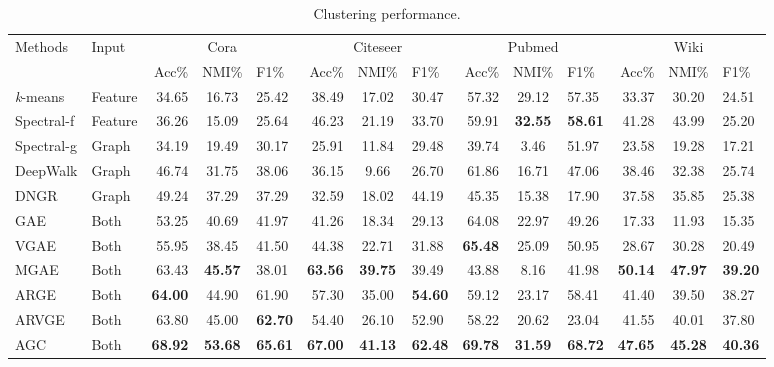 \documentclass{article}
\begin{document}
\begin{table*}[t]\footnotesize
 \centering
  \begin{tabular}{l l rcl| rcl| rcl| rcl}
   \toprule
   Methods & Input & \multicolumn{3}{c}{{Cora}} & \multicolumn{3}{c}{{Citeseer}} & \multicolumn{3}{c}{{Pubmed}} & \multicolumn{3}{c}{{Wiki}}\\
   \cmidrule(lr){3-5} \cmidrule(lr){6-8} \cmidrule(lr){9-11} \cmidrule(lr){12-14}
   & & {Acc\%} & {NMI\%} & {F1\%}  & {Acc\%} & {NMI\%} & {F1\%}  & {Acc\%} & {NMI\%} & {F1\%} & {Acc\%} & {NMI\%} & {F1\%}\\
   \midrule
   {\emph{k}-means}  & Feature & 34.65 & 16.73 & 25.42 & 38.49 & 17.02 & 30.47  & 57.32 & 29.12 & 57.35 & 33.37 & 30.20  & 24.51  \\
   Spectral-f  & Feature & 36.26 & 15.09 & 25.64 & 46.23 & 21.19 & 33.70  & 59.91 & \textbf{32.55} & \textbf{58.61} & 41.28 & 43.99 & 25.20  \\
   \midrule
   Spectral-g & Graph &  34.19 & 19.49 & 30.17 &  25.91 & 11.84 & 29.48 &  39.74 & 3.46 & 51.97 & 23.58 & 19.28 & 17.21  \\
   DeepWalk & Graph & 46.74 & 31.75 & 38.06  & 36.15 & 9.66 & 26.70  & 61.86 & 16.71 & 47.06 &  38.46 & 32.38 & 25.74  \\
   DNGR & Graph   & 49.24 & 37.29 & 37.29  & 32.59 & 18.02 & 44.19 & 45.35 & 15.38 & 17.90 & 37.58 & 35.85 & 25.38  \\
   \midrule
   GAE & Both & 53.25 & 40.69 & 41.97 & 41.26 & 18.34 & 29.13  & 64.08 & 22.97 & 49.26 &  17.33 &  11.93 & 15.35   \\
   VGAE & Both & 55.95 & 38.45 & 41.50 & 44.38 & 22.71 & 31.88  & \textbf{65.48} & 25.09 & 50.95 &  28.67 & 30.28 &  20.49  \\
   MGAE & Both & 63.43 & \textbf{45.57} & 38.01 & \textbf{63.56} & \textbf{39.75} & 39.49 & 43.88 & 8.16 & 41.98 & \textbf{50.14} & \textbf{47.97} & \textbf{39.20}\\
   ARGE & Both & \textbf{64.00} & 44.90 & 61.90 & 57.30 & 35.00 & \textbf{54.60}   & 59.12 & 23.17 & 58.41 & 41.40 & 39.50 &  38.27  \\
   ARVGE & Both & 63.80 & 45.00 & \textbf{62.70} & 54.40 & 26.10 & 52.90  & 58.22 & 20.62 & 23.04 & 41.55 & 40.01 & 37.80   \\
   \midrule
   AGC & Both & \textbf{68.92} & \textbf{53.68} & \textbf{65.61} & \textbf{67.00} & \textbf{41.13} & \textbf{62.48} & \textbf{69.78} & \textbf{31.59} & \textbf{68.72} & \textbf{47.65} & \textbf{45.28}   &  \textbf{40.36} \\
   \bottomrule
  \end{tabular}
  \caption{Clustering performance.}
  \label{tab:results}
\end{table*}
\end{document}
